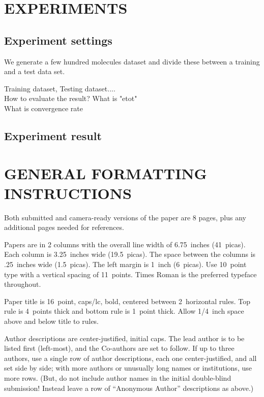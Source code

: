 \documentclass[twoside]{article}
\begin{document}
\section{EXPERIMENTS}


\subsection{Experiment settings}

We generate a few hundred molecules dataset and divide these between a training and a test data set.

Training dataset, Testing dataset.... \\

How to evaluate the result?
What is "etot" \\
What is convergence rate \\

	

\subsection{Experiment result}



\section{GENERAL FORMATTING INSTRUCTIONS}



Both submitted and camera-ready versions of the paper are 8 pages,
plus any additional pages needed for references.

Papers are in 2 columns with the overall line width of 6.75~inches (41~picas). Each column is 3.25~inches wide (19.5~picas).  The space
between the columns is .25~inches wide (1.5~picas).  The left margin is 1~inch (6~picas).  Use 10~point type with a vertical spacing of
11~points. Times Roman is the preferred typeface throughout.

Paper title is 16~point, caps/lc, bold, centered between 2~horizontal rules.  Top rule is 4~points thick and bottom rule is 1~point thick.
Allow 1/4~inch space above and below title to rules.

Author descriptions are center-justified, initial caps.  The lead
author is to be listed first (left-most), and the Co-authors are set
to follow.  If up to three authors, use a single row of author
descriptions, each one center-justified, and all set side by side;
with more authors or unusually long names or institutions, use more
rows.  (But, do not include author names in the initial double-blind
submission!  Instead leave a row of ``Anonymous Author'' descriptions
as above.)
\end{document}

